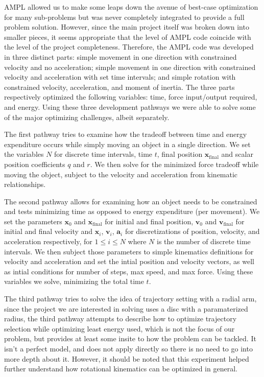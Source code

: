 \documentclass{report}
\begin{document}
AMPL allowed us to make some leaps down the avenue of best-case optimization for
many sub-problems but was never completely integrated to provide a full problem
solution. However, since the main project itself was broken down into smaller
pieces, it seems appropriate that the level of AMPL code coincide with the
level of the project completeness. Therefore, the AMPL code was developed in
three distinct parts: simple movement in one direction with constrained velocity
and no acceleration; simple movement in one direction with constrained velocity
and acceleration with set time intervals; and simple rotation with constrained
velocity, acceleration, and moment of inertia. The three parts respectively optimized the
following variables: time, force input/output required, and energy.
Using these three development pathways we were able to solve some of the major
optimizing challenges, albeit separately.

The first pathway tries to examine how the tradeoff between time and energy
expenditure occurs while simply moving an object in a single direction. We set
the variables $N$ for discrete time intervals, time $t$, final position $\mathbf{x}_\text{final}$
and
scalar position coefficients $q$ and $r$. We then solve for the minimized force
tradeoff while moving the object, subject to the velocity and acceleration from
kinematic relationships. 

The second pathway allows for examining how an object needs to be constrained 
and tests minimizing time as opposed to energy expenditure (per movement).
We set the parameters $\mathbf{x}_0$ and $\mathbf{x}_\text{final}$ for initial and
final position, $\mathbf{v}_0$ and $\mathbf{v}_\text{final}$ for
initial and final velocity and $\mathbf{x}_i$, $\mathbf{v}_i$, $\mathbf{a}_i$
for discretizations of position,
velocity, and acceleration respectively, for $1 \leq i \leq N$ where $N$
is the number of discrete
time intervals. We then subject those parameters to simple kinematics definitions
for velocity and acceleration and set the intial position and velocity vectors,
as well as intial conditions for number of steps, max speed, and max force.
Using these variables we solve, minimizing the total time $t$. 

The third pathway tries to solve the idea of trajectory setting with a radial
arm, since the project we are interested in solving uses a disc with a
paramaterized radius, the third pathway attempts to describe how to optimize
trajectory selection while optimizing least energy used, which is not the focus
of our problem, but provides at least some insite to how the problem can be 
tackled. It isn't a perfect model, and does not apply directly so there is no
need to go into more depth about it. However, it should be noted that this
experiment helped further understand how rotational kinematics can be optimized
in general.
\end{document}
